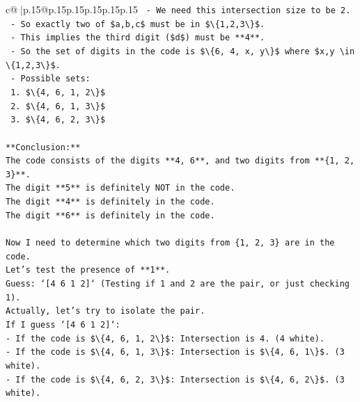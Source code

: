 \documentclass{article}
\begin{document}
{\begin{supertabular}{c@{$\;$}|p{.15\linewidth}@{}p{.15\linewidth}p{.15\linewidth}p{.15\linewidth}p{.15\linewidth}p{.15\linewidth}}
{{{\texttt{        {-} We need this intersection size to be 2.} \\
\texttt{        {-} So exactly two of \$a,b,c\$ must be in \$\textbackslash{}\{1,2,3\textbackslash{}\}\$.} \\
\texttt{        {-} This implies the third digit (\$d\$) must be **4**.} \\
\texttt{        {-} So the set of digits in the code is \$\textbackslash{}\{6, 4, x, y\textbackslash{}\}\$ where \$x,y \textbackslash{}in \textbackslash{}\{1,2,3\textbackslash{}\}\$.} \\
\texttt{        {-} Possible sets:} \\
\texttt{          1. \$\textbackslash{}\{4, 6, 1, 2\textbackslash{}\}\$} \\
\texttt{          2. \$\textbackslash{}\{4, 6, 1, 3\textbackslash{}\}\$} \\
\texttt{          3. \$\textbackslash{}\{4, 6, 2, 3\textbackslash{}\}\$} \\
\\ 
\texttt{**Conclusion:**} \\
\texttt{The code consists of the digits **4, 6**, and two digits from **\{1, 2, 3\}**.} \\
\texttt{The digit **5** is definitely NOT in the code.} \\
\texttt{The digit **4** is definitely in the code.} \\
\texttt{The digit **6** is definitely in the code.} \\
\\ 
\texttt{Now I need to determine which two digits from \{1, 2, 3\} are in the code.} \\
\texttt{Let's test the presence of **1**.} \\
\texttt{Guess: `{[}4 6 1 2{]}` (Testing if 1 and 2 are the pair, or just checking 1).} \\
\texttt{Actually, let's try to isolate the pair.} \\
\texttt{If I guess `{[}4 6 1 2{]}`:} \\
\texttt{{-} If the code is \$\textbackslash{}\{4, 6, 1, 2\textbackslash{}\}\$: Intersection is 4. (4 white).} \\
\texttt{{-} If the code is \$\textbackslash{}\{4, 6, 1, 3\textbackslash{}\}\$: Intersection is \$\textbackslash{}\{4, 6, 1\textbackslash{}\}\$. (3 white).} \\
\texttt{{-} If the code is \$\textbackslash{}\{4, 6, 2, 3\textbackslash{}\}\$: Intersection is \$\textbackslash{}\{4, 6, 2\textbackslash{}\}\$. (3 white).} \\
}}}
\end{supertabular}}
\end{document}
